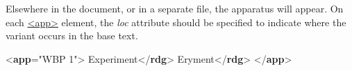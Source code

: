 Elsewhere in the document, or in a separate file, the apparatus will appear. On each \hyperref[TEI.app]{<app>} element, the {\itshape loc} attribute should be specified to indicate where the variant occurs in the base text. \par\bgroup{}\exampleFont \begin{shaded}\noindent\mbox{}{<\textbf{app}\hspace*{1em}{loc}="{WBP 1}">}\mbox{}\newline 
{}Experiment{</\textbf{rdg}>}\mbox{}\newline 
{}Eryment{</\textbf{rdg}>}\mbox{}\newline 
{</\textbf{app}>}\end{shaded}\egroup\par \par
